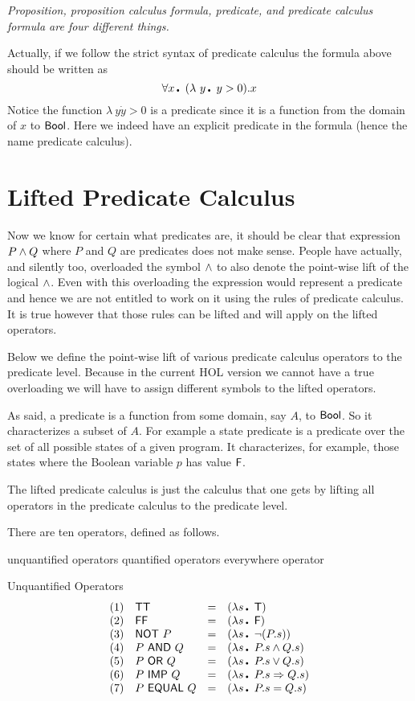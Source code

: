 {\em Proposition, proposition calculus formula, predicate, and
predicate calculus formula are four different things.}

Actually, if we follow the strict syntax of predicate calculus the
formula above should be written as \[ \qA x\Dot (\lambda\ y\Dot y>0).x
\] Notice the function $\lambda\ y\Dot y>0$ is a predicate since it is
a function from the domain of $x$ to ${\sf Bool}$. Here we indeed have an
explicit predicate in the formula (hence the name predicate calculus).

\section{Lifted Predicate Calculus}

Now we know for certain what predicates are, it should be clear that
expression $P \wedge Q$ where $P$ and $Q$ are predicates does not make
sense. People have actually, and silently too, overloaded the symbol
$\wedge$ to also denote the point-wise lift of the logical $\wedge$. Even
with this overloading the expression would represent a predicate and
hence we are not entitled to work on it using the rules of predicate
calculus. It is true however that those rules can be lifted and will
apply on the lifted operators.

Below we define the point-wise lift of various predicate calculus
operators to the predicate level. Because in the current HOL version
we cannot have a true overloading we will have to assign different
symbols to the lifted operators.

As said, a predicate is a function from some domain, say $A$, to
${\sf Bool}$. So it characterizes a subset of $A$. For example a state
predicate is a predicate over the set of all possible states of a
given program. It characterizes, for example, those states where the
Boolean variable $p$ has value $\mbox{\sf F}$.

The lifted predicate calculus is just the calculus that one gets by
lifting all operators in the predicate calculus to the predicate
level. 

There are ten operators, defined as follows. 

\enddocs
{}
\endmoddef
\LA{}unquantified operators\RA{}
\LA{}quantified operators\RA{}
\LA{}everywhere operator\RA{}
\endcode
{}


\begin{definition}{Unquantified Operators}
\[ \begin{array}{llcl}
     (1) & \TT & = & (\lambda s\Dot  \true) \\
     (2) & \FF & = & (\lambda s\Dot  \false) \\
     (3) & \pNOT P & = & (\lambda s\Dot  \NOT(P.s)) \\
     (4) & P \pAND Q & = & (\lambda s\Dot  P.s \AND Q.s) \\ 
     (5) & P \pOR Q & = & (\lambda s\Dot  P.s \OR Q.s) \\ 
     (6) & P \pIMP Q & = & (\lambda s\Dot  P.s \IMP Q.s) \\ 
     (7) & P \pEQU Q & = & (\lambda s\Dot  P.s = Q.s) 
   \end{array}\]
\end{definition}

